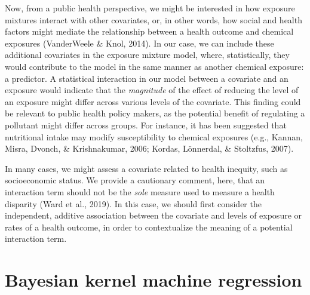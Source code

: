 \documentclass[12pt, twoside]{amherstthesis}
\begin{document}
Now, from a public health perspective, we might be interested in how exposure mixtures interact with other covariates, or, in other words, how social and health factors might mediate the relationship between a health outcome and chemical exposures (VanderWeele \& Knol, 2014). In our case, we can include these additional covariates in the exposure mixture model, where, statistically, they would contribute to the model in the same manner as another chemical exposure: a predictor. A statistical interaction in our model between a covariate and an exposure would indicate that the \emph{magnitude} of the effect of reducing the level of an exposure might differ across various levels of the covariate. This finding could be relevant to public health policy makers, as the potential benefit of regulating a pollutant might differ across groups. For instance, it has been suggested that nutritional intake may modify susceptibility to chemical exposures (e.g., Kannan, Misra, Dvonch, \& Krishnakumar, 2006; Kordas, Lönnerdal, \& Stoltzfus, 2007).

In many cases, we might assess a covariate related to health inequity, such as socioeconomic status. We provide a cautionary comment, here, that an interaction term should not be the \emph{sole} measure used to measure a health disparity (Ward et al., 2019). In this case, we should first consider the independent, additive association between the covariate and levels of exposure or rates of a health outcome, in order to contextualize the meaning of a potential interaction term.

\hypertarget{bkmr}{%
\section{Bayesian kernel machine regression}\label{bkmr}}
\end{document}
